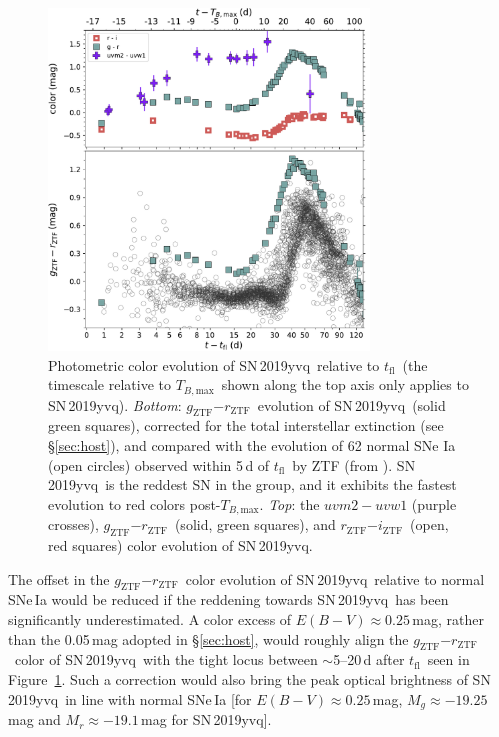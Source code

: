 \documentclass[twocolumn]{aastex63}
\newcommand{\rztf}{$r_\mathrm{ZTF}$}
\newcommand{\gztf}{$g_\mathrm{ZTF}$}
\newcommand{\iztf}{$i_\mathrm{ZTF}$}
\newcommand{\tfl}{$t_\mathrm{fl}$}
\newcommand{\tbmax}{$T_{B,\mathrm{max}}$}
\newcommand{\sn}{SN\,2019yvq}
\begin{document}
\begin{figure}
    \centering
    \includegraphics[width=3.35in]{./figures/P48_colors.pdf}
    \caption{Photometric color evolution of \sn\ relative to \tfl\ (the
    timescale relative to \tbmax\ shown along the top axis only applies to
    \sn). \textit{Bottom}: \gztf$ - $\rztf\ evolution of \sn\ (solid green
    squares), corrected for the total interstellar extinction (see
    \S\ref{sec:host}), and compared with the evolution of 62 normal SNe Ia
    (open circles) observed within 5\,d of \tfl\ by ZTF (from
    \citealt{Bulla20}). \sn\ is the reddest SN in the group, and it exhibits
    the fastest evolution to red colors post-\tbmax. \textit{Top}: the
    $uvm2 - uvw1$ (purple crosses), \gztf$ - $\rztf\ (solid, green squares),
    and \rztf$ - $\iztf\ (open, red squares) color evolution of \sn.}
    \label{fig:colors}
\end{figure}

The offset in the \gztf$ - $\rztf\ color evolution of \sn\ relative to normal
SNe\,Ia would be reduced if the reddening towards \sn\ has been significantly
underestimated. A color excess of $E(B-V) \approx 0.25$\,mag, rather than the
0.05\,mag adopted in \S\ref{sec:host}, would roughly align the \gztf$ -
$\rztf\ color of \sn\ with the tight locus between $\sim$5--20\,d after \tfl\
seen in Figure~\ref{fig:colors}. Such a correction would also bring the peak
optical brightness of \sn\ in line with normal SNe\,Ia [for $E(B-V) \approx
0.25$\,mag, $M_g \approx -19.25$\,mag and $M_r \approx -19.1$\,mag for \sn].
\end{document}
